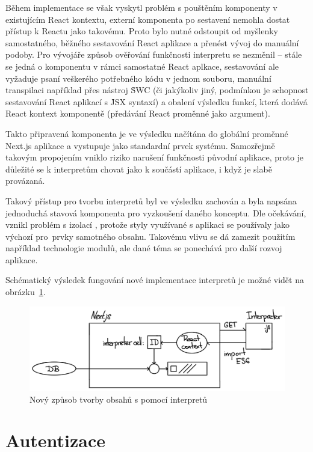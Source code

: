 Během implementace se však vyskytl problém s pouštěním komponenty v existujícím React kontextu, externí komponenta po sestavení nemohla dostat přístup k Reactu jako takovému.
Proto bylo nutné odstoupit od myšlenky samostatného, běžného sestavování React aplikace a přenést vývoj do manuální podoby.
Pro vývojáře způsob ověřování funkčnosti interpretu se nezměnil – stále se jedná o komponentu v rámci samostatné React aplkace, sestavování ale vyžaduje psaní veškerého potřebného kódu v jednom souboru, manuální transpilaci například přes nástroj \h{SWC} (či jakýkoliv jiný, podmínkou je schopnost sestavování React aplikací s \h{JSX} syntaxí) a obalení výsledku funkcí, která dodává React kontext komponentě (předávání React proměnné jako argument).

Takto připravená komponenta je ve výsledku načítána do globální proměnné Next.js aplikace a vystupuje jako standardní prvek systému.
Samozřejmě takovým propojením vniklo riziko narušení funkčnosti původní aplikace, proto je důležité se k interpretům chovat jako k součástí aplikace, i když je slabě provázaná.

Takový přístup pro tvorbu interpretů byl ve výsledku zachován a byla napsána jednoduchá stavová komponenta pro vyzkoušení daného konceptu.
Dle očekávání, vznikl problém s izolací , protože styly využívané s aplikaci se používaly jako výchozí pro~prvky samotného obsahu.
Takovému vlivu se dá zamezit použitím například technologie  modulů, ale dané téma se ponechává pro další rozvoj aplikace.

Schématický výsledek fungování nové implementace interpretů je možné vidět na obrázku~\ref{fig:client-interpreter-new}.


\begin{figure}[htbp]
   \centering
   \includegraphics[max width=\textwidth]{assets/interpreters-new}
   \caption{Nový způsob tvorby obsahů s pomocí interpretů}\label{fig:client-interpreter-new}
\end{figure}



\section{Autentizace}\label{sec:client-auth}

